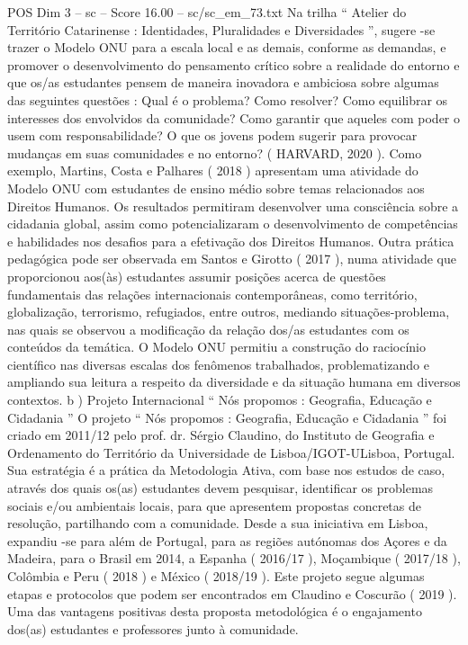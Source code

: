 \begin{textsample}{POS Dim 3 – sc – Score 16.00 – sc/sc\_em\_73.txt}
Na trilha “ Atelier do Território Catarinense : Identidades, Pluralidades e Diversidades ”, sugere -se trazer o Modelo ONU para a escala local e as demais, conforme as demandas, e promover o desenvolvimento do pensamento crítico sobre a realidade do entorno e que os/as estudantes pensem de maneira inovadora e ambiciosa sobre algumas das seguintes questões : Qual é o problema?
Como resolver?
Como equilibrar os interesses dos envolvidos da comunidade?
Como garantir que aqueles com poder o usem com responsabilidade?
O que os jovens podem sugerir para provocar mudanças em suas comunidades e no entorno? ( HARVARD, 2020 ).
Como exemplo, Martins, Costa e Palhares ( 2018 ) apresentam uma atividade do Modelo ONU com estudantes de ensino médio sobre temas relacionados aos Direitos Humanos.
Os resultados permitiram desenvolver uma consciência sobre a cidadania global, assim como potencializaram o desenvolvimento de competências e habilidades nos desafios para a efetivação dos Direitos Humanos.
Outra prática pedagógica pode ser observada em Santos e Girotto ( 2017 ), numa atividade que proporcionou aos(às) estudantes assumir posições acerca de questões fundamentais das relações internacionais contemporâneas, como território, globalização, terrorismo, refugiados, entre outros, mediando situações-problema, nas quais se observou a modificação da relação dos/as estudantes com os conteúdos da temática.
O Modelo ONU permitiu a construção do raciocínio científico nas diversas escalas dos fenômenos trabalhados, problematizando e ampliando sua leitura a respeito da diversidade e da situação humana em diversos contextos. b ) Projeto Internacional “ Nós propomos : Geografia, Educação e Cidadania ” O projeto “ Nós propomos : Geografia, Educação e Cidadania ” foi criado em 2011/12 pelo prof. dr.
Sérgio Claudino, do Instituto de Geografia e Ordenamento do Território da Universidade de Lisboa/IGOT-ULisboa, Portugal.
Sua estratégia é a prática da Metodologia Ativa, com base nos estudos de caso, através dos quais os(as) estudantes devem pesquisar, identificar os problemas sociais e/ou ambientais locais, para que apresentem propostas concretas de resolução, partilhando com a comunidade.
Desde a sua iniciativa em Lisboa, expandiu -se para além de Portugal, para as regiões autónomas dos Açores e da Madeira, para o Brasil em 2014, a Espanha ( 2016/17 ), Moçambique ( 2017/18 ), Colômbia e Peru ( 2018 ) e México ( 2018/19 ).
Este projeto segue algumas etapas e protocolos que podem ser encontrados em Claudino e Coscurão ( 2019 ).
Uma das vantagens positivas desta proposta metodológica é o engajamento dos(as) estudantes e professores junto à comunidade.

\end{textsample}
